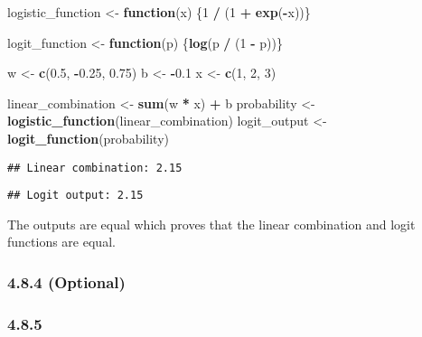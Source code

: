 \documentclass[
]{article}
\newenvironment{Shaded}{\begin{snugshade}}{\end{snugshade}}
\newcommand{\ControlFlowTok}[1]{\textcolor[rgb]{0.13,0.29,0.53}{\textbf{#1}}}
\newcommand{\DecValTok}[1]{\textcolor[rgb]{0.00,0.00,0.81}{#1}}
\newcommand{\FloatTok}[1]{\textcolor[rgb]{0.00,0.00,0.81}{#1}}
\newcommand{\FunctionTok}[1]{\textcolor[rgb]{0.13,0.29,0.53}{\textbf{#1}}}
\newcommand{\NormalTok}[1]{#1}
\newcommand{\OtherTok}[1]{\textcolor[rgb]{0.56,0.35,0.01}{#1}}
\newcommand{\SpecialCharTok}[1]{\textcolor[rgb]{0.81,0.36,0.00}{\textbf{#1}}}
\begin{document}
\begin{Shaded}
\begin{Highlighting}[]
\NormalTok{logistic\_function }\OtherTok{\textless{}{-}} \ControlFlowTok{function}\NormalTok{(x) \{}\DecValTok{1} \SpecialCharTok{/}\NormalTok{ (}\DecValTok{1} \SpecialCharTok{+} \FunctionTok{exp}\NormalTok{(}\SpecialCharTok{{-}}\NormalTok{x))\}}

\NormalTok{logit\_function }\OtherTok{\textless{}{-}} \ControlFlowTok{function}\NormalTok{(p) \{}\FunctionTok{log}\NormalTok{(p }\SpecialCharTok{/}\NormalTok{ (}\DecValTok{1} \SpecialCharTok{{-}}\NormalTok{ p))\}}

\NormalTok{w }\OtherTok{\textless{}{-}} \FunctionTok{c}\NormalTok{(}\FloatTok{0.5}\NormalTok{, }\SpecialCharTok{{-}}\FloatTok{0.25}\NormalTok{, }\FloatTok{0.75}\NormalTok{)}
\NormalTok{b }\OtherTok{\textless{}{-}} \SpecialCharTok{{-}}\FloatTok{0.1}
\NormalTok{x }\OtherTok{\textless{}{-}} \FunctionTok{c}\NormalTok{(}\DecValTok{1}\NormalTok{, }\DecValTok{2}\NormalTok{, }\DecValTok{3}\NormalTok{)}

\NormalTok{linear\_combination }\OtherTok{\textless{}{-}} \FunctionTok{sum}\NormalTok{(w }\SpecialCharTok{*}\NormalTok{ x) }\SpecialCharTok{+}\NormalTok{ b}
\NormalTok{probability }\OtherTok{\textless{}{-}} \FunctionTok{logistic\_function}\NormalTok{(linear\_combination)}
\NormalTok{logit\_output }\OtherTok{\textless{}{-}} \FunctionTok{logit\_function}\NormalTok{(probability)}
\end{Highlighting}
\end{Shaded}

\begin{verbatim}
## Linear combination: 2.15
\end{verbatim}

\begin{verbatim}
## Logit output: 2.15
\end{verbatim}

The outputs are equal which proves that the linear combination and logit
functions are equal.

\subsubsection{4.8.4 (Optional)}\label{optional-1}

\subsubsection{4.8.5}\label{section-5}
\end{document}
